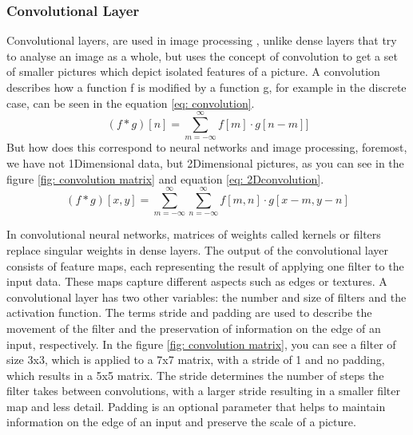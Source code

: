 \subsubsection{Convolutional Layer}
Convolutional layers, are used in image processing \cite{lecun_backpropagation_1989,szegedy_going_2014,krizhevsky_imagenet_2012}, unlike dense layers that try to analyse an image as a whole, but uses the concept of convolution to get a set of smaller pictures which depict isolated features of a picture.
A convolution describes how a function f is modified by a function g, for example in the discrete case, can be seen in the equation \ref{eq: convolution}.
\begin{equation}
(f \ast g)[n]
    = \sum_{m=-\infty}^{\infty}f[m]\cdot g[n - m]
    \label{eq: convolution}]
\end{equation}
But how does this correspond to neural networks and image processing, foremost, we have not 1Dimensional data, but 2Dimensional pictures, as you can see in the figure \ref{fig: convolution matrix} and equation \ref{eq: 2Dconvolution}.
\begin{equation}
(f \ast g)[x,y]
    = \sum^{\infty}_{m=-\infty} \sum^{\infty}_{n=-\infty} f[m,n]\cdot g[x-m,y-n]
    \label{eq: 2Dconvolution}
\end{equation}

In convolutional neural networks, matrices of weights called kernels or filters replace singular weights in dense layers.
The output of the convolutional layer consists of feature maps, each representing the result of applying one filter to the input data.
These maps capture different aspects such as edges or textures.
A convolutional layer has two other variables: the number and size of filters and the activation function.
The terms stride and padding are used to describe the movement of the filter and the preservation of information on the edge of an input, respectively.
In the figure \ref{fig: convolution matrix}, you can see a filter of size 3x3, which is applied to a 7x7 matrix, with a stride of 1 and no padding, which results in a 5x5 matrix.
The stride determines the number of steps the filter takes between convolutions, with a larger stride resulting in a smaller filter map and less detail.
Padding is an optional parameter that helps to maintain information on the edge of an input and preserve the scale of a picture.

